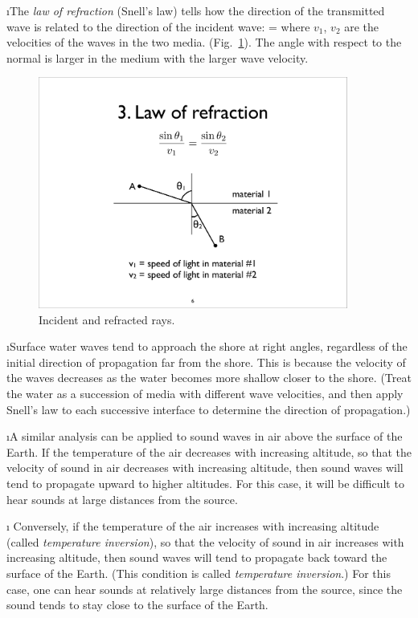 \i The {\em law of refraction} (Snell's law) 
tells how the direction of the transmitted wave is 
related to the direction of the incident wave:
%
\be
{} = 
\ee
%
where $v_1$, $v_2$ are the velocities of the waves in 
the two media.
(Fig.~\ref{f:refraction}).  
The angle with respect to the normal is larger in the 
medium with the larger wave velocity.
%
\begin{figure}[htbp]
  \begin{center}
  \includegraphics[width=4in]{refraction}
  \caption{Incident and refracted rays.}
  \label{f:refraction}
  \end{center}
\end{figure}

\i \ex Surface water waves tend to approach the shore 
at right angles, regardless of the initial direction
of propagation far from the shore.
This is because the velocity 
of the waves decreases as the water becomes more shallow
closer to the shore.
(Treat the water as a succession of media with 
different wave velocities, and then apply
Snell's law to each successive interface to determine
the direction of propagation.)

\i \ex A similar analysis can be applied to sound waves
in air above the surface of the Earth.
If the temperature of the air decreases with 
increasing altitude, so that the velocity of 
sound in air decreases with increasing altitude, then 
sound waves will tend to propagate upward to higher 
altitudes.
For this case, it will be difficult
to hear sounds at large distances from the source.

\i \ex
Conversely, if the temperature of the air increases
with increasing altitude (called {\em temperature 
inversion}), so that the velocity of 
sound in air increases with increasing altitude, then 
sound waves will tend to propagate back toward the
surface of the Earth.
(This condition is called {\em temperature inversion}.)
For this case, one can hear sounds at relatively large
distances from the source, since the sound tends to
stay close to the surface of the Earth.


